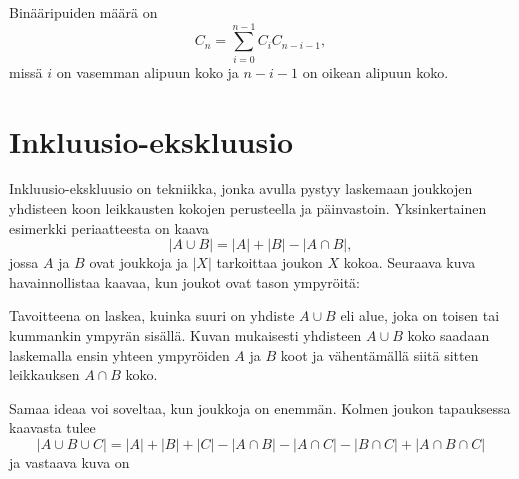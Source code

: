 Binääripuiden määrä on
\[ C_n = \sum_{i=0}^{n-1} C_{i} C_{n-i-1},\]
missä $i$ on vasemman alipuun koko ja 
$n-i-1$ on oikean alipuun koko.

\section{Inkluusio-ekskluusio}

Inkluusio-ekskluusio
on tekniikka, jonka avulla pystyy laskemaan
joukkojen yhdisteen koon leikkausten
kokojen perusteella ja päinvastoin.
Yksinkertainen esimerkki periaatteesta on kaava
\[ |A \cup B| = |A| + |B| - |A \cap B|,\]
jossa $A$ ja $B$ ovat joukkoja ja $|X|$
tarkoittaa joukon $X$ kokoa.
Seuraava kuva havainnollistaa kaavaa,
kun joukot ovat tason ympyröitä:

\begin{center}
\end{center}

Tavoitteena on laskea, kuinka suuri on yhdiste $A \cup B$
eli alue, joka on toisen tai kummankin ympyrän sisällä.
Kuvan mukaisesti yhdisteen $A \cup B$ koko
saadaan laskemalla ensin yhteen ympyröiden $A$ ja $B$ koot
ja vähentämällä siitä sitten leikkauksen $A \cap B$ koko.

Samaa ideaa voi soveltaa, kun joukkoja on enemmän.
Kolmen joukon tapauksessa kaavasta tulee
\[ |A \cup B \cup C| = |A| + |B| + |C| - |A \cap B|  - |A \cap C|  - |B \cap C| + |A \cap B \cap C| \]
ja vastaava kuva on

\begin{center}
\end{center}

